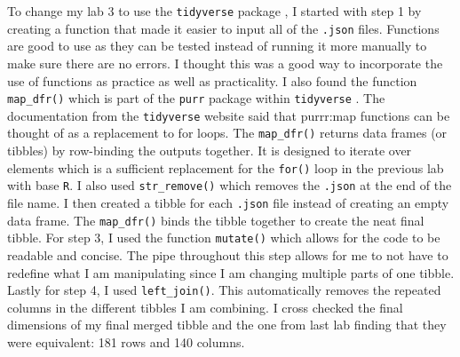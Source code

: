\documentclass{article}\usepackage[]{graphicx}\usepackage[]{xcolor}
\begin{document}
\begin{enumerate}
To change my lab 3 to use the \texttt{tidyverse} package \citep{tidyverse}, I started with step 1 by creating a function that made it easier to input all of the \texttt{.json} files. Functions are good to use as they can be tested instead of running it more manually to make sure there are no errors. I thought this was a good way to incorporate the use of functions as practice as well as practicality. I also found the function \texttt{map\_dfr()} which is part of the \texttt{purr} package \citep{WickhamHenry} within \texttt{tidyverse} \citep{tidyverse}. The documentation from the \texttt{tidyverse} \citep{tidyverse} website said that purrr:map functions can be thought of as a replacement to for loops. The \texttt{map\_dfr()} returns data frames (or tibbles) by row-binding the outputs together. It is designed to iterate over elements which is a sufficient replacement for the \texttt{for()} loop in the previous lab with base \texttt{R}. I also used \texttt{str\_remove()}  \citep{Wickham} which removes the \texttt{.json} at the end of the file name. I then created a tibble for each \texttt{.json} file instead of creating an empty data frame. The \texttt{map\_dfr()} binds the tibble together to create the neat final tibble. For step 3, I used the function \texttt{mutate()} which allows for the code to be readable and concise. The pipe throughout this step allows for me to not have to redefine what I am manipulating since I am changing multiple parts of one tibble. Lastly for step 4, I used \texttt{left\_join()}. This automatically removes the repeated columns in the different tibbles I am combining. I cross checked the final dimensions of my final merged tibble and the one from last lab finding that they were equivalent: 181 rows and 140 columns. 

\end{enumerate}

\end{document}
